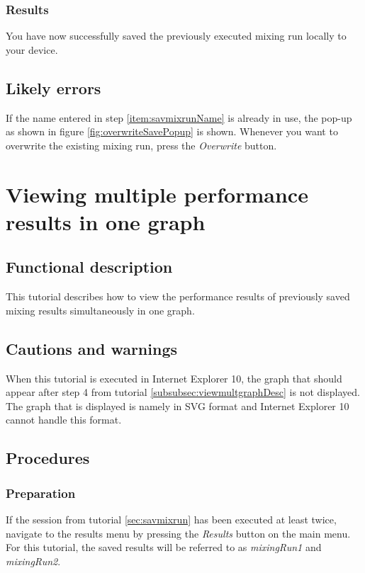 \subsubsection{Results}
You have now successfully saved the previously executed mixing run locally to your device.

\subsection{Likely errors}
If the name entered in step \ref{item:savmixrunName} is already in use, the pop-up as shown in figure \ref{fig:overwriteSavePopup} is shown. Whenever you want to overwrite the existing mixing run, press the \emph{Overwrite} button.


\section{Viewing multiple performance results in one graph}\label{sec:viewmultgraph}

\subsection{Functional description}
This tutorial describes how to view the performance results of previously saved mixing results simultaneously in one graph.

\subsection{Cautions and warnings}
When this tutorial is executed in Internet Explorer 10, the graph that should appear after step 4 from tutorial \ref{subsubsec:viewmultgraphDesc} is not displayed. The graph that is displayed is namely in SVG format and Internet Explorer 10 cannot handle this format.

\subsection{Procedures}

\subsubsection{Preparation}
If the session from tutorial \ref{sec:savmixrun} has been executed at least twice, navigate to the results menu by pressing the \emph{Results} button on the main menu.
For this tutorial, the saved results will be referred to as \emph{mixingRun1} and \emph{mixingRun2}.


